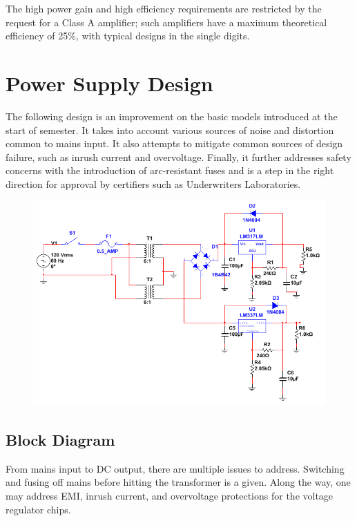 \documentclass[journal]{IEEEtran}
\begin{document}
The high power gain and high efficiency requirements are restricted by the request for a Class A amplifier; such amplifiers have a maximum theoretical efficiency of 25\%, with typical designs in the single digits.

\section{Power Supply Design}

The following design is an improvement on the basic models introduced at the start of semester. It takes into account various sources of noise and distortion common to mains input. It also attempts to mitigate common sources of design failure, such as inrush current and overvoltage. Finally, it further addresses safety concerns with the introduction of arc-resistant fuses and is a step in the right direction for approval by certifiers such as Underwriters Laboratories. 

\begin{figure}[H]
\centering
\includegraphics[scale=.36]{final-psu.png}
\label{fig_psu_schem}
\end{figure}

\subsection{Block Diagram}

From mains input to DC output, there are multiple issues to address. Switching and fusing off mains before hitting the transformer is a given. Along the way, one may address EMI, inrush current, and overvoltage protections for the voltage regulator chips.
\end{document}
